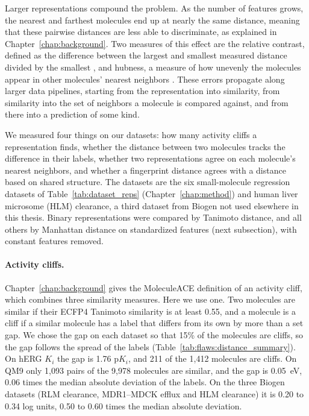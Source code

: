 Larger representations compound the problem. As the number of features grows, the nearest and farthest molecules end up at nearly the same distance, meaning that these pairwise distances are less able to discriminate, as explained in Chapter~\ref{chap:background}. Two measures of this effect are the relative contrast, defined as the difference between the largest and smallest measured distance divided by the smallest \citep{Aggarwal2001}, and hubness, a measure of how unevenly the molecules appear in other molecules' nearest neighbors \citep{Radovanovic2010}. These errors propagate along larger data pipelines, starting from the representation into similarity, from similarity into the set of neighbors a molecule is compared against, and from there into a prediction of some kind. 

We measured four things on our datasets: how many activity cliffs a representation finds, whether the distance between two molecules tracks the difference in their labels, whether two representations agree on each molecule's nearest neighbors, and whether a fingerprint distance agrees with a distance based on shared structure. The datasets are the six small-molecule regression datasets of Table~\ref{tab:dataset_reps} (Chapter~\ref{chap:method}) and human liver microsome (HLM) clearance, a third dataset from Biogen not used elsewhere in this thesis. Binary representations were compared by Tanimoto distance, and all others by Manhattan distance on standardized features (next subsection), with constant features removed.

\paragraph{Activity cliffs.} Chapter~\ref{chap:background} gives the MoleculeACE definition of an activity cliff, which combines three similarity measures. Here we use one. Two molecules are similar if their ECFP4 Tanimoto similarity is at least 0.55, and a molecule is a cliff if a similar molecule has a label that differs from its own by more than a set gap. We chose the gap on each dataset so that 15\% of the molecules are cliffs, so the gap follows the spread of the labels (Table~\ref{tab:flaws:distance_summary}). On hERG $K_i$ the gap is 1.76 p$K_i$, and 211 of the 1,412 molecules are cliffs. On QM9 only 1,093 pairs of the 9,978 molecules are similar, and the gap is 0.05~eV, 0.06 times the median absolute deviation of the labels. On the three Biogen datasets (RLM clearance, MDR1--MDCK efflux and HLM clearance) it is 0.20 to 0.34 log units, 0.50 to 0.60 times the median absolute deviation.

